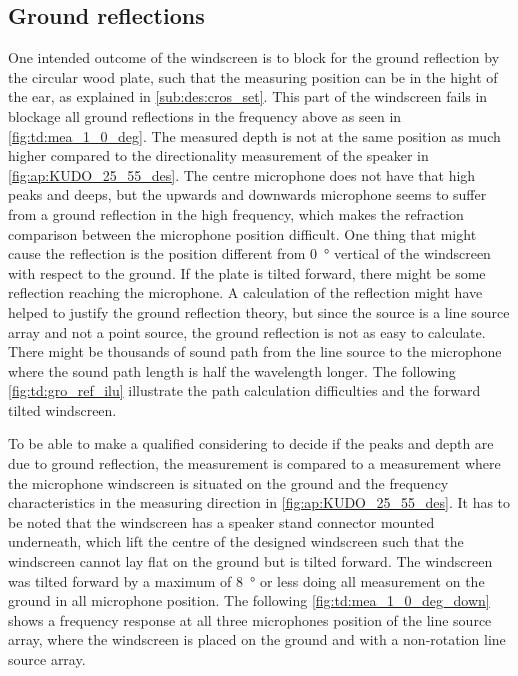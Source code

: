 \subsection{Ground reflections}\label{sec:des:ground_reflection}
One intended outcome of the windscreen is to block for the ground reflection by the circular wood plate, such that the measuring position can be in the hight of the ear, as explained in \autoref{sub:des:cros_set}. This part of the windscreen fails in blockage all ground reflections in the frequency above  as seen in \autoref{fig:td:mea_1_0_deg}. The measured depth is not at the same position as much higher compared to the directionality measurement of the speaker in \autoref{fig:ap:KUDO_25_55_des}. The centre microphone does not have that high peaks and deeps, but the upwards and downwards microphone seems to suffer from a ground reflection in the high frequency, which makes the refraction comparison between the microphone position difficult. One thing that might cause the reflection is the position different from \SI{0}{\degree} vertical of the windscreen with respect to the ground. If the plate is tilted forward, there might be some reflection reaching the microphone. A calculation of the reflection might have helped to justify the ground reflection theory, but since the source is a line source array and not a point source, the ground reflection is not as easy to calculate. There might be thousands of sound path from the line source to the microphone where the sound path length is half the wavelength longer. The following \autoref{fig:td:gro_ref_ilu} illustrate the path calculation difficulties and the forward tilted windscreen. 



To be able to make a qualified considering to decide if the peaks and depth are due to ground reflection, the measurement is compared to a measurement where the microphone windscreen is situated on the ground and the frequency characteristics in the measuring direction in \autoref{fig:ap:KUDO_25_55_des}.  It has to be noted that the windscreen has a speaker stand connector mounted underneath, which lift the centre of the designed windscreen such that the windscreen cannot lay flat on the ground but is tilted forward. The windscreen was tilted forward by a maximum of \SI{8}{\degree} or less doing all measurement on the ground in all microphone position. The following \autoref{fig:td:mea_1_0_deg_down} shows a frequency response at all three microphones position of the line source array, where the windscreen is placed on the ground and with a non-rotation line source array.

